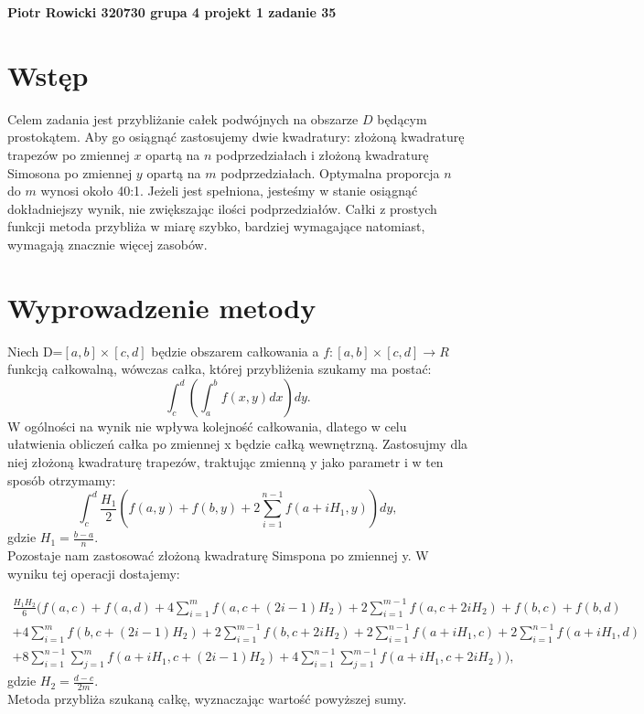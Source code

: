\documentclass[a4paper,12pt]{article}
\begin{document}
\def\tablename{Tabela} %


\noindent
\textbf{Piotr Rowicki 320730 grupa 4 projekt 1 zadanie 35}


\section*{Wstęp} %
Celem zadania jest przybliżanie całek podwójnych na obszarze $D$ będącym prostokątem. Aby go osiągnąć zastosujemy dwie kwadratury: złożoną kwadraturę trapezów po zmiennej $x$ opartą na $n$ podprzedziałach i złożoną kwadraturę Simosona po zmiennej $y$ opartą na $m$ podprzedziałach. Optymalna proporcja $n$ do $m$ wynosi około 40:1. Jeżeli jest spełniona, jesteśmy w stanie osiągnąć dokładniejszy wynik, nie zwiększając ilości podprzedziałów. Całki z prostych funkcji metoda przybliża w miarę szybko, bardziej wymagające  natomiast, wymagają znacznie więcej zasobów.


\section*{Wyprowadzenie metody}
Niech D=$[a,b]\times[c,d]$ będzie obszarem całkowania a $f:[a,b]\times[c,d]\xrightarrow{} R$ funkcją całkowalną, wówczas całka, której przybliżenia szukamy ma postać:
\begin{equation*} \label{eu_eqn}
\int_{c}^{d} \left( \int_{a}^{b}f(x,y)dx\right)dy.
\end{equation*}
W ogólności na wynik nie wpływa kolejność całkowania, dlatego w celu ułatwienia obliczeń całka po zmiennej x będzie całką wewnętrzną. Zastosujmy dla niej złożoną kwadraturę trapezów, traktując zmienną y jako parametr i  w ten sposób otrzymamy:
\begin{equation} \label{eu_eqn}
\int_{c}^{d} \frac{H_1}{2}\left( f(a,y) + f(b,y)+ 2\sum_{i=1}^{n-1}f(a+i H_1,y) \right)dy,
\end{equation}
gdzie $H_1=\frac{b-a}{n}$.\\
Pozostaje nam zastosować złożoną kwadraturę Simspona po zmiennej y. W wyniku tej operacji dostajemy:

\begin{multline*} \label{eu_eqn}
\frac{H_1 H_2}{6} \bigg( f(a,c) +f(a,d)+4\sum_{i=1}^{m}f(a,c+(2i-1) H_2)+2\sum_{i=1}^{m-1}f(a,c+2i H_2)+f(b,c) +f(b,d) \\
+4\sum_{i=1}^{m}f(b,c+(2i-1) H_2)+2\sum_{i=1}^{m-1}f(b,c+2i H_2)+
2\sum_{i=1}^{n-1}f(a+i H_1,c)+2\sum_{i=1}^{n-1}f(a+i  H_1,d)\\
+8\sum_{i=1}^{n-1}\sum_{j=1}^{m}f(a+i H_1,c+(2i-1)H_2)+4\sum_{i=1}^{n-1}\sum_{j=1}^{m-1}f(a+i H_1,c+2i H_2) \bigg),                                                                 
\end{multline*}
gdzie $H_2=\frac{d-c}{2m}$.
\\ Metoda przybliża szukaną całkę, wyznaczając wartość powyższej sumy.
\end{document}
